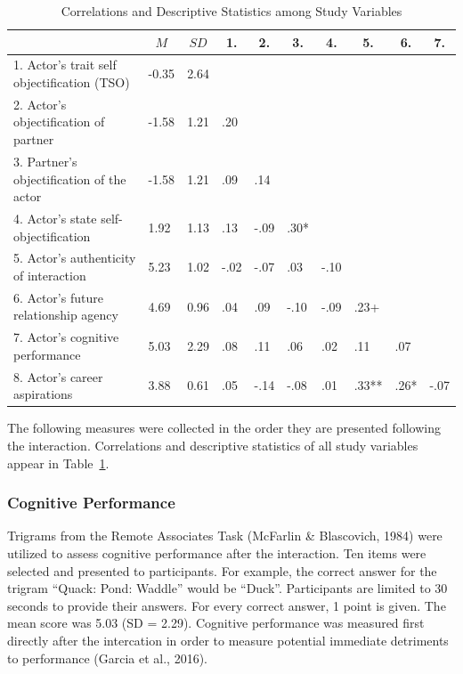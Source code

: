\documentclass[man]{apa6}
\begin{document}
\begin{table}[tbp]
\begin{center}
\begin{threeparttable}
\caption{\label{tab:corrtable}Correlations and Descriptive Statistics among Study Variables}
\begin{tabular}{llllllllll}
\toprule
 & \multicolumn{1}{c}{$M$} & \multicolumn{1}{c}{$SD$} & \multicolumn{1}{c}{1.} & \multicolumn{1}{c}{2.} & \multicolumn{1}{c}{3.} & \multicolumn{1}{c}{4.} & \multicolumn{1}{c}{5.} & \multicolumn{1}{c}{6.} & \multicolumn{1}{c}{7.}\\
\midrule
1. Actor's trait self objectification (TSO) & -0.35 & 2.64 &  &  &  &  &  &  & \\
2. Actor's objectification of partner & -1.58 & 1.21 & .20 &  &  &  &  &  & \\
3. Partner's objectification of the actor & -1.58 & 1.21 & .09 & .14 &  &  &  &  & \\
4. Actor's state self-objectification & 1.92 & 1.13 & .13 & -.09 & .30* &  &  &  & \\
5. Actor's authenticity of interaction & 5.23 & 1.02 & -.02 & -.07 & .03 & -.10 &  &  & \\
6. Actor's future relationship agency & 4.69 & 0.96 & .04 & .09 & -.10 & -.09 & .23+ &  & \\
7. Actor's cognitive performance & 5.03 & 2.29 & .08 & .11 & .06 & .02 & .11 & .07 & \\
8. Actor's career aspirations & 3.88 & 0.61 & .05 & -.14 & -.08 & .01 & .33** & .26* & -.07\\
\bottomrule
\end{tabular}
\end{threeparttable}
\end{center}
\end{table}

The following measures were collected in the order they are presented
following the interaction. Correlations and descriptive statistics of
all study variables appear in Table~\ref{tab:corrtable}.

\subsubsection{Cognitive Performance}\label{cognitive-performance}

Trigrams from the Remote Associates Task (McFarlin \& Blascovich, 1984)
were utilized to assess cognitive performance after the interaction. Ten
items were selected and presented to participants. For example, the
correct answer for the trigram \enquote{Quack: Pond: Waddle} would be
\enquote{Duck}. Participants are limited to 30 seconds to provide their
answers. For every correct answer, 1 point is given. The mean score was
5.03 (SD = 2.29). Cognitive performance was measured first directly
after the intercation in order to measure potential immediate detriments
to performance (Garcia et al., 2016).
\end{document}
